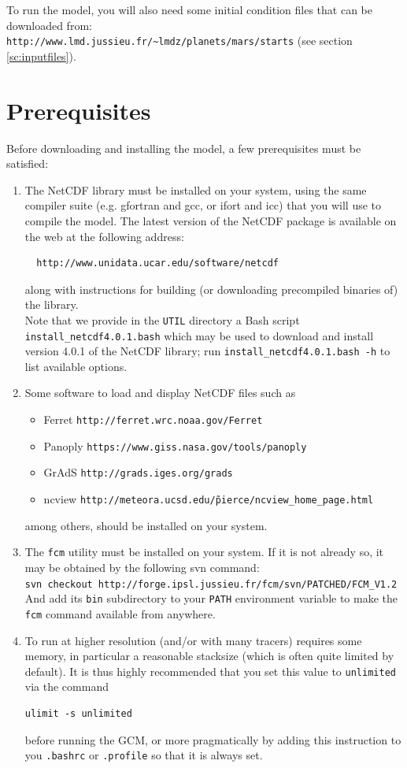 To run the model, you will also need some initial condition files that
can be downloaded from:\\
{\verb+http://www.lmd.jussieu.fr/~lmdz/planets/mars/starts+}
(see section \ref{sc:inputfiles}).

\section{Prerequisites}
Before downloading and installing the model, a few prerequisites
must be satisfied:
\begin{enumerate}
\item The NetCDF library must be installed
 on your system, using the same
 compiler suite (e.g. gfortran and gcc, or ifort and icc) that you will use
 to compile the model. The latest version of the NetCDF package is available
 on the web at the following address:
  \begin{verbatim}
  http://www.unidata.ucar.edu/software/netcdf
  \end{verbatim}
  along with instructions for building (or downloading precompiled
  binaries of) the library.\\
  Note that we provide in the {\tt UTIL} directory a Bash script
  {\tt install\_netcdf4.0.1.bash} which may be used to download and install
  version 4.0.1 of the NetCDF library; run {\tt install\_netcdf4.0.1.bash -h}
  to list available options.
\item Some software to load and display NetCDF files such as 
   \begin{itemize}
   \item Ferret {\tt http://ferret.wrc.noaa.gov/Ferret}
   \item Panoply {\tt https://www.giss.nasa.gov/tools/panoply}
   \item GrAdS {\tt http://grads.iges.org/grads}
   \item ncview {\tt http://meteora.ucsd.edu/\~pierce/ncview\_home\_page.html}
   \end{itemize}
   among others, should be installed on your system.
\item The {\tt fcm} utility must be installed on your system.
  If it is not already so, it may be obtained by the following svn command:\\
  {\tt svn checkout http://forge.ipsl.jussieu.fr/fcm/svn/PATCHED/FCM\_V1.2}\\
  And add its {\tt bin} subdirectory to your {\tt PATH} environment variable
  to make the {\tt fcm} command available from anywhere.
\item To run at higher resolution (and/or with many tracers) requires some memory, in particular a reasonable stacksize (which is often quite limited by default). It is thus highly recommended that you set this value to {\tt unlimited} via
the command
\begin{verbatim}
ulimit -s unlimited
\end{verbatim}
before running the GCM, or more pragmatically by adding this instruction to you
{\tt .bashrc} or {\tt .profile} so that it is always set.
\end{enumerate}


